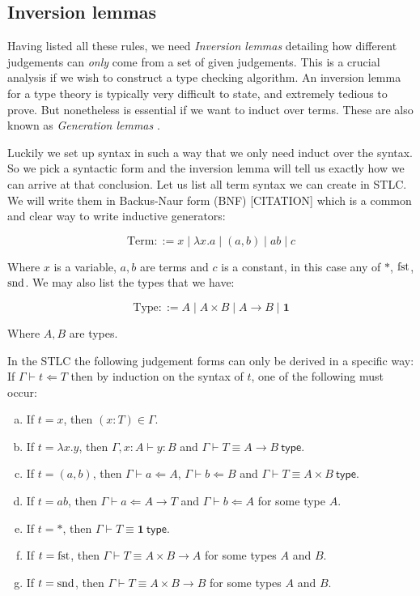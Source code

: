 \subsection{Inversion lemmas}
Having listed all these rules, we need \emph{Inversion lemmas} detailing how different judgements can \emph{only} come from a set of given judgements. This is a crucial analysis if we wish to construct a type checking algorithm. An inversion lemma for a type theory is typically very difficult to state, and extremely tedious to prove. But nonetheless is essential if we want to induct over terms. These are also known as \emph{Generation lemmas} \cite{Sorensen, harper_2016}.

Luckily we set up syntax in such a way that we only need induct over the syntax. So we pick a syntactic form and the inversion lemma will tell us exactly how we can arrive at that conclusion. Let us list all term syntax we can create in STLC. We will write them in Backus-Naur form (BNF) [CITATION] which is a common and clear way to write inductive generators:

$$
    \mathrm{Term} ::= x \mid \lambda x . a \mid (a, b) \mid a b \mid c
$$

Where $x$ is a variable, $a, b$ are terms and $c$ is a constant, in this case any of $*$, $\mathrm{fst}$, $\mathrm{snd}$. We may also list the types that we have:

$$
    \mathrm{Type} ::= A \mid A \times B \mid A \to B \mid \mathbf{1}
$$

Where $A, B$ are types.


\begin{lemma}\label{inversion}
    In the STLC the following judgement forms can only be derived in a specific way:
    If $\Gamma \vdash t \Leftarrow T$ then by induction on the syntax of $t$, one of the following must occur:
    \begin{enumerate}[(a)]
        \item If $t = x$, then $(x : T) \in \Gamma$.\label{inv_1_a}
        \item If $t = \lambda x . y$, then $\Gamma , x : A \vdash y : B$ and $\Gamma \vdash T \equiv A \to B \ \mathsf{type}$.\label{inv_1_b}
        \item If $t = (a , b)$, then $\Gamma \vdash a \Leftarrow A$, $\Gamma \vdash b \Leftarrow B$ and $\Gamma \vdash T \equiv A \times B \ \mathsf{type}$.\label{inv_1_c}
        \item If $t = a b$, then $\Gamma \vdash a \Leftarrow A \to T$ and $\Gamma \vdash b \Leftarrow A$ for some type $A$.\label{inv_1_d}
        \item If $t = *$, then $\Gamma \vdash T \equiv \mathbf{1}\ \mathsf{type}$.\label{inv_1_e}
        \item If $t = \mathrm{fst}$, then $\Gamma \vdash T \equiv A \times B \to A$ for some types $A$ and $B$.\label{inv_1_f}
        \item If $t = \mathrm{snd}$, then $\Gamma \vdash T \equiv A \times B \to B$ for some types $A$ and $B$.\label{inv_1_g}
    \end{enumerate}
\end{lemma}

